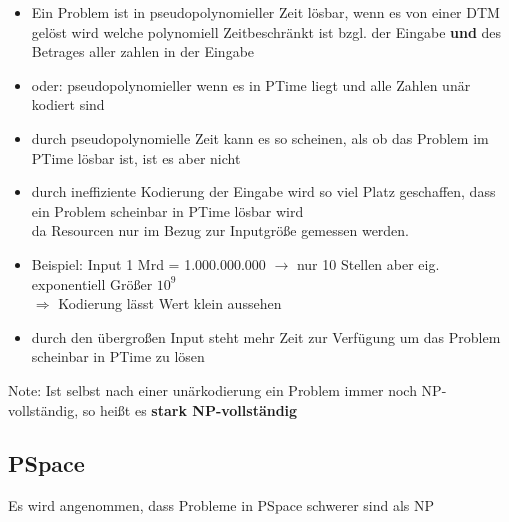 \documentclass[12pt,a4paper]{article}
\begin{document}
\begin{itemize}
\item Ein Problem ist in pseudopolynomieller Zeit lösbar, wenn es von einer DTM gelöst wird welche polynomiell Zeitbeschränkt ist bzgl. der Eingabe \textbf{und} des Betrages aller zahlen in der Eingabe
\item oder: pseudopolynomieller wenn es in PTime liegt und alle Zahlen unär kodiert sind
\item durch pseudopolynomielle Zeit kann es so scheinen, als ob das Problem im PTime lösbar ist, ist es aber nicht
\item durch ineffiziente Kodierung der Eingabe wird so viel Platz geschaffen, dass ein Problem scheinbar in PTime lösbar wird\\da Resourcen nur im Bezug zur Inputgröße gemessen werden.
\item Beispiel: Input 1 Mrd = 1.000.000.000 $\rightarrow$ nur 10 Stellen aber eig. exponentiell Größer $10^9$\\
$\Rightarrow$ Kodierung lässt Wert klein aussehen
\item durch den übergroßen Input steht mehr Zeit zur Verfügung um das Problem scheinbar in PTime zu lösen
\end{itemize}
Note: Ist selbst nach einer unärkodierung ein Problem immer noch NP-vollständig, so heißt es \textbf{stark NP-vollständig}


\subsection{PSpace}
Es wird angenommen, dass Probleme in PSpace schwerer sind als NP
\end{document}
